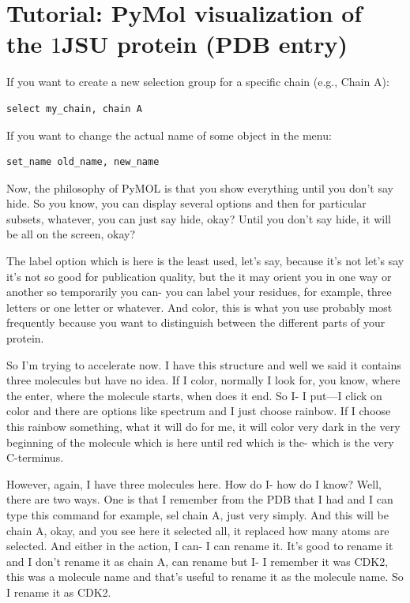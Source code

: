 \section{Tutorial: PyMol visualization of the $1$JSU protein (PDB entry)}

If you want to create a new selection group for a specific chain (e.g., Chain A):

\begin{verbatim}
select my_chain, chain A
\end{verbatim}

If you want to change the actual name of some object in the menu:

\begin{verbatim}
set_name old_name, new_name
\end{verbatim}



Now, the philosophy of PyMOL is that you show everything until you don't say hide. So you know, you can display several options and then for particular subsets, whatever, you can just say hide, okay? Until you don't say hide, it will be all on the screen, okay?

The label option which is here is the least used, let's say, because it's not let's say it's not so good for publication quality, but the it may orient you in one way or another so temporarily you can- you can label your residues, for example, three letters or one letter or whatever. And color, this is what you use probably most frequently because you want to distinguish between the different parts of your protein.

So I'm trying to accelerate now. I have this structure and well we said it contains three molecules but have no idea. If I color, normally I look for, you know, where the enter, where the molecule starts, when does it end. So I- I put—I click on color and there are options like spectrum and I just choose rainbow. If I choose this rainbow something, what it will do for me, it will color very dark in the very beginning of the molecule which is here until red which is the- which is the very C-terminus.

However, again, I have three molecules here. How do I- how do I know? Well, there are two ways. One is that I remember from the PDB that I had and I can type this command for example, sel chain A, just very simply. And this will be chain A, okay, and you see here it selected all, it replaced how many atoms are selected. And either in the action, I can- I can rename it. It's good to rename it and I don't rename it as chain A, can rename but I- I remember it was CDK2, this was a molecule name and that's useful to rename it as the molecule name. So I rename it as CDK2.

